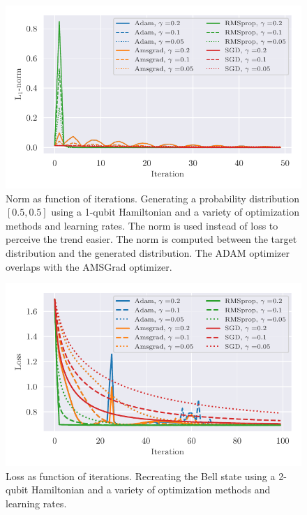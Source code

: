 \documentclass[../main.tex]{subfiles}
\begin{document}
\begin{figure}[h]
    \begin{center}
        \includegraphics{figures/H1_ab_new_norm.pdf}
        \caption{Norm as function of iterations. Generating a probability distribution $[0.5, 0.5]$ using a 1-qubit Hamiltonian and a variety of optimization methods and learning rates. The norm is used instead of loss to perceive the trend easier. The norm is computed between the target distribution and the generated distribution. The ADAM optimizer overlaps with the AMSGrad optimizer.}
        \label{fig:H1_loss_es}
    \end{center}
\end{figure}


\begin{figure}[h]
    \begin{center}
        \includegraphics{figures/H2_ab_loss_linear.pdf}
        \caption{Loss as function of iterations. Recreating the Bell state using a 2-qubit Hamiltonian and a variety of optimization methods and learning rates.}
        \label{fig:loss_vs_it_vs_lr}
    \end{center}
\end{figure}
\end{document}
